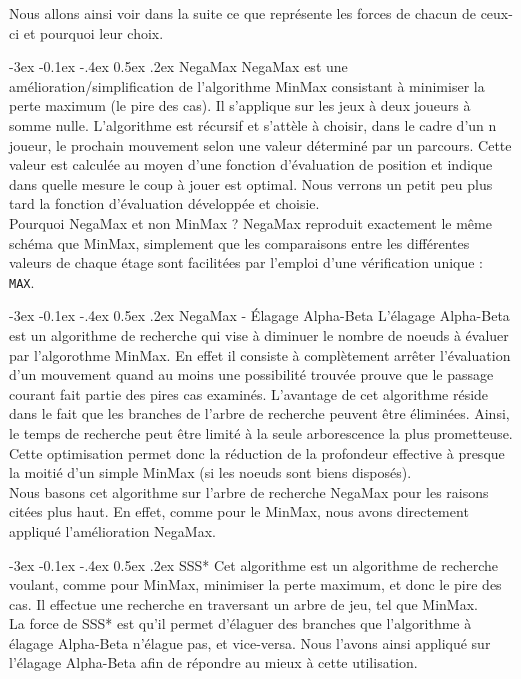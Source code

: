 \documentclass[a4paper]{article}
\makeatletter
\renewcommand{\subsection}{\@startsection {subsection}{2}{\z@}
{-3ex \@plus -0.1ex \@minus -.4ex}
{0.5ex \@plus.2ex }
{\normalfont\sffamily\bfseries}}
\makeatother
\begin{document}
Nous allons ainsi voir dans la suite ce que représente les forces de chacun de ceux-ci et pourquoi leur choix.

\subsection{NegaMax}
NegaMax est une amélioration/simplification de l'algorithme MinMax consistant à minimiser la perte maximum (le pire des cas). Il s'applique sur les jeux à deux joueurs à somme nulle. L'algorithme est récursif et s'attèle à choisir, dans le cadre d'un n joueur, le prochain mouvement selon une valeur déterminé par un parcours. Cette valeur est calculée au moyen d'une fonction d'évaluation de position et indique dans quelle mesure le coup à jouer est optimal. Nous verrons un petit peu plus tard la fonction d'évaluation développée et choisie.\\
Pourquoi NegaMax et non MinMax ? NegaMax reproduit exactement le même schéma que MinMax, simplement que les comparaisons entre les différentes valeurs de chaque étage sont facilitées par l'emploi d'une vérification unique : \texttt{MAX}.

\subsection{NegaMax - \'Elagage Alpha-Beta}
L'élagage Alpha-Beta est un algorithme de recherche qui vise à diminuer le nombre de noeuds à évaluer par l'algorothme MinMax. En effet il consiste à complètement arrêter l'évaluation d'un mouvement quand au moins une possibilité trouvée prouve que le passage courant fait partie des pires cas examinés. L'avantage de cet algorithme réside dans le fait que les branches de l'arbre de recherche peuvent être éliminées. Ainsi, le temps de recherche peut être limité à la seule arborescence la plus prometteuse. Cette optimisation permet donc la réduction de la profondeur effective à presque la moitié d'un simple MinMax (si les noeuds sont biens disposés).\\
Nous basons cet algorithme sur l'arbre de recherche NegaMax pour les raisons citées plus haut. En effet, comme pour le MinMax, nous avons directement appliqué l'amélioration NegaMax.

\subsection{SSS*}
Cet algorithme est un algorithme de recherche voulant, comme pour MinMax, minimiser la perte maximum, et donc le pire des cas. Il effectue une recherche en traversant un arbre de jeu, tel que MinMax.\\
La force de SSS* est qu'il permet d'élaguer des branches que l'algorithme à élagage Alpha-Beta n'élague pas, et vice-versa. Nous l'avons ainsi appliqué sur l'élagage Alpha-Beta afin de répondre au mieux à cette utilisation.
\end{document}
